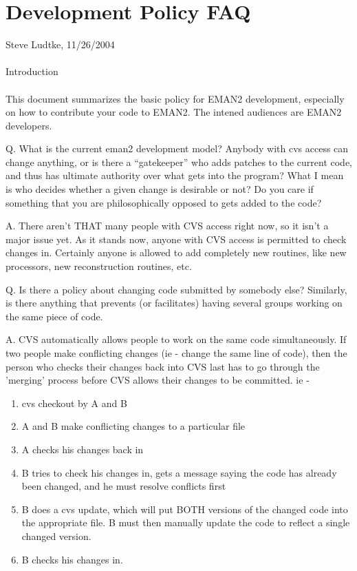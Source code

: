 %

\section{Development Policy FAQ}
  \label{DEVELOPEMENT-POLICY-FAQ} 


Steve Ludtke, 11/26/2004\\ 
\\ 
Introduction \\ 
\\ 
 This document summarizes the basic policy for EMAN2 development, especially on how to contribute your code to EMAN2. The intened audiences are EMAN2 developers.

 Q. What is the current eman2 development model? Anybody with cvs access can change anything, or is there a ``gatekeeper'' who adds patches to the current code, and thus has ultimate authority over what gets into  the program? What I mean is who decides whether a given change is desirable or not? Do you care if something that you are philosophically opposed to gets added to the code? 


 A. There aren't THAT many people with CVS access right now, so it isn't a major issue yet. As it stands now, anyone with CVS access is permitted to check changes in. Certainly anyone is allowed to add completely new routines, like new processors, new reconstruction routines, etc. 


 Q. Is there a policy about changing code submitted by somebody else?  Similarly, is there anything that prevents (or facilitates) having  several groups working on the same piece of code.


 A. CVS automatically allows people to work on the same code simultaneously. If two people make conflicting changes (ie - change the same line of code), then the person who checks their changes back into CVS last has to go through the 'merging' process before CVS allows their changes to be committed. ie -

\begin{enumerate}
\item cvs checkout by A and B 
\item A and B make conflicting changes to a particular file 
\item A checks his changes back in 
\item B tries to check his changes in, gets a message saying the code has  already been changed, and he must resolve conflicts first 
\item B does a cvs update, which will put BOTH versions of the changed code  into the appropriate file. B must then manually update the code to reflect  a single changed version. 
\item B checks his changes in. 

\end{enumerate}


